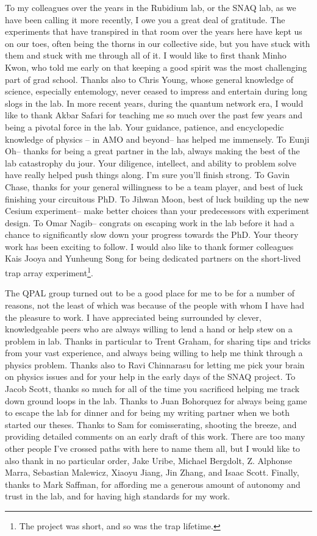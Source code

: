 To my colleagues over the years in the Rubidium lab, or the SNAQ lab, as we have been calling it more recently, I owe you a great deal of gratitude. The experiments that have transpired in that room over the years here have kept us on our toes, often being the thorns in our collective side, but you have stuck with them and stuck with me through all of it. I would like to first thank Minho Kwon, who told me early on that keeping a good spirit was the most challenging part of grad school. Thanks also to Chris Young, whose general knowledge of science, especially entemology, never ceased to impress and entertain during long slogs in the lab. In more recent years, during the quantum network era, I would like to thank Akbar Safari for teaching me so much over the past few years and being a pivotal force in the lab. Your guidance, patience, and encyclopedic knowledge of physics -- in AMO and beyond-- has helped me immensely. To Eunji Oh-- thanks for being a great partner in the lab, always making the best of the lab catastrophy du jour. Your diligence, intellect, and ability to problem solve have really helped push things along. I'm sure you'll finish strong. To Gavin Chase, thanks for your general willingness to be a team player, and best of luck finishing your circuitous PhD. To Jihwan Moon, best of luck building up the new Cesium experiment-- make better choices than your predecessors with experiment design. To Omar Nagib-- congrats on escaping work in the lab before it had a chance to significantly slow down your progress towards the PhD. Your theory work has been exciting to follow. I would also like to thank former colleagues Kais Jooya and Yunheung Song for being dedicated partners on the short-lived trap array experiment\footnote{The project was short, and so was the trap lifetime.}.

The QPAL group turned out to be a good place for me to be for a number of reasons, not the least of which was because of the people with whom I have had the pleasure to work. I have appreciated being surrounded by clever, knowledgeable peers who are always willing to lend a hand or help stew on a problem in lab. Thanks in particular to Trent Graham, for sharing tips and tricks from your vast experience, and always being willing to help me think through a physics problem. Thanks also to Ravi Chinnarasu for letting me pick your brain on physics issues and for your help in the early days of the SNAQ project. To Jacob Scott, thanks so much for all of the time you sacrificed helping me track down ground loops in the lab. Thanks to Juan Bohorquez for always being game to escape the lab for dinner and for being my writing partner when we both started our theses. Thanks to Sam for comisserating, shooting the breeze, and providing detailed comments on an early draft of this work. There are too many other people I've crossed paths with here to name them all, but I would like to also thank in no particular order, Jake Uribe, Michael Bergdolt, Z. Alphonse Marra, Sebastian Malewicz, Xiaoyu Jiang, Jin Zhang, and Isaac Scott. Finally, thanks to Mark Saffman, for affording me a generous amount of autonomy and trust in the lab, and for having high standards for my work. 

